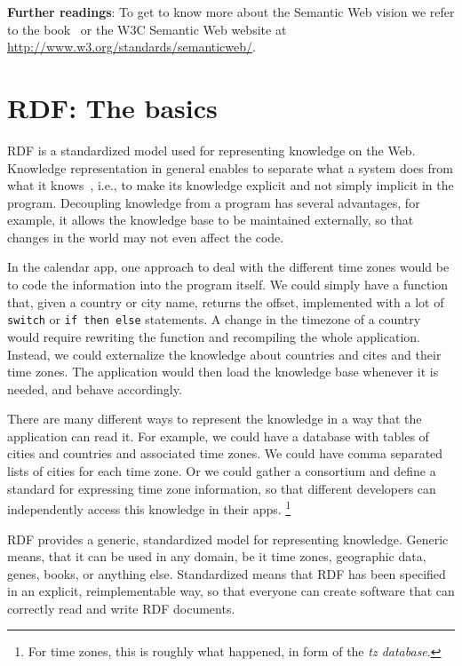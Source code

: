 \documentclass{IOS-Book-Article}
\begin{document}
\medskip

\textbf{Further readings}:
To get to know more about the Semantic Web vision we refer to the book~\cite{swbook} or the W3C Semantic Web website at \url{http://www.w3.org/standards/semanticweb/}.

\section{RDF: The basics}
\label{rdf}

RDF is a standardized model used for representing knowledge on the Web.
Knowledge representation in general enables to separate what a system does from what it knows~\cite{brachmannKR}, i.e., to make its knowledge explicit and not simply implicit in the program.
Decoupling knowledge from a program has several advantages, for example, it allows the knowledge base to be maintained externally, so that changes in the world may not even affect the code.

In the calendar app, one approach to deal with the different time zones would be to code the information into the program itself. 
We could simply have a function that, given a country or city name, returns the offset, implemented with a lot of \texttt{switch} or \texttt{if then else} statements.
A change in the timezone of a country would require rewriting the function and recompiling the whole application.
Instead, we could externalize the knowledge about countries and cites and their time zones.
The application would then load the knowledge base whenever it is needed, and behave accordingly.

There are many different ways to represent the knowledge in a way that the application can read it.
For example, we could have a database with tables of cities and countries and associated time zones.
We could have comma separated lists of cities for each time zone.
Or we could gather a consortium and define a standard for expressing time zone information, so that different developers can independently access this knowledge in their apps.%
\footnote{For time zones, this is roughly what happened, in form of the \textit{tz database}.}

RDF provides a generic, standardized model for representing knowledge.
Generic means, that it can be used in any domain, be it time zones, geographic data, genes, books, or anything else.
Standardized means that RDF has been specified in an explicit, reimplementable way, so that everyone can create software that can correctly read and write RDF documents.
\end{document}
